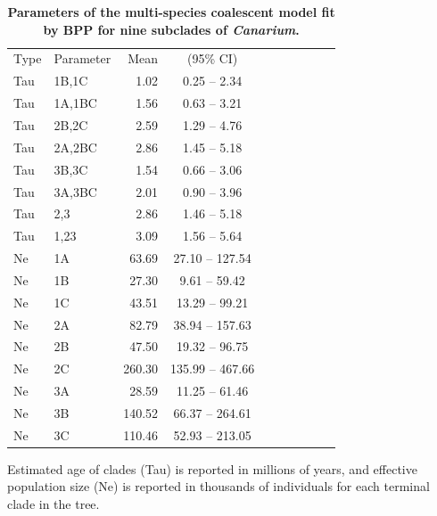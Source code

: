 \documentclass[10pt,letterpaper]{article}
\newlength\savedwidth
\newcommand\thickhline{\noalign{\global\savedwidth\arrayrulewidth\global\arrayrulewidth 2pt}%
  \hline
  \noalign{\global\arrayrulewidth\savedwidth}}
\begin{document}
\begin{table}[!ht]
  \centering
  \caption{
    {\bf Parameters of the multi-species coalescent model fit by BPP for nine subclades of \emph{Canarium}.}
  }
  \begin{tabular}{llrcrrrrrr}
  \toprule
  Type       &  Parameter     &    Mean &    (95\% CI) \\
  \thickhline
  Tau        &  1B,1C         &    1.02  &  0.25 -- 2.34 \\
  Tau        &  1A,1BC        &    1.56  &  0.63 -- 3.21 \\
  Tau        &  2B,2C         &    2.59  &  1.29 -- 4.76 \\
  Tau        &  2A,2BC        &    2.86  &  1.45 -- 5.18 \\  
  Tau        &  3B,3C         &    1.54  &  0.66 -- 3.06 \\
  Tau        &  3A,3BC        &    2.01  &  0.90 -- 3.96 \\  
  Tau        &  2,3           &    2.86  &  1.46 -- 5.18 \\
  Tau        &  1,23          &    3.09  &  1.56 -- 5.64 \\
  Ne         &  1A            &    63.69 &  27.10 -- 127.54 \\
  Ne         &  1B            &    27.30 &  9.61  -- 59.42  \\
  Ne         &  1C            &    43.51 &  13.29 -- 99.21  \\
  Ne         &  2A            &    82.79 &  38.94 -- 157.63 \\
  Ne         &  2B            &    47.50 &  19.32 -- 96.75  \\
  Ne         &  2C            &    260.30 & 135.99 -- 467.66 \\
  Ne         &  3A            &    28.59  & 11.25  -- 61.46 \\
  Ne         &  3B            &    140.52 & 66.37  -- 264.61 \\
  Ne         &  3C            &    110.46 & 52.93  -- 213.05 \\
   \bottomrule
  \end{tabular}
  \begin{flushleft} Estimated age of clades (Tau) is reported in millions of years,
    and effective population size (Ne) is reported in thousands of individuals for each
    terminal clade in the tree.
  \end{flushleft}
  \label{tab:tab1}
\end{table}
\end{document}
